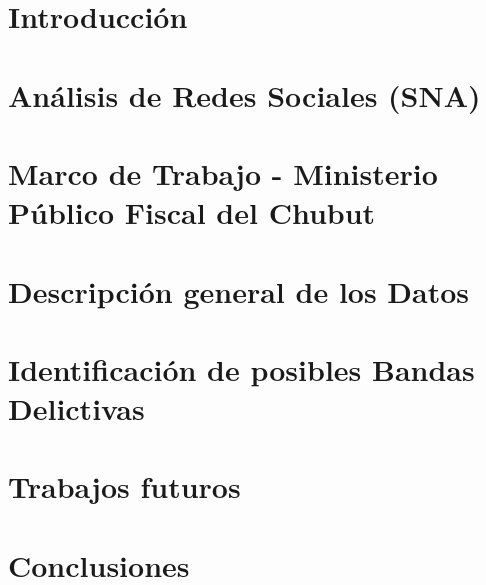 \documentclass[runningheads]{llncs}
\begin{document}
%

\maketitle              %

%

%
\section{Introducción}


\section{Análisis de Redes Sociales (SNA)}


\section{Marco de Trabajo - Ministerio Público Fiscal del Chubut}


\section{Descripción general de los Datos}


\section{Identificación de posibles Bandas Delictivas}


\section{Trabajos futuros}


\section{Conclusiones}

\end{document}
